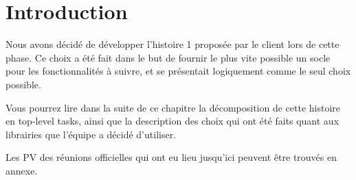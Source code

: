 \section{Introduction}
Nous avons décidé de développer l'histoire 1 proposée par le client
lors de cette phase. Ce choix a été fait dans le but de fournir le
plus vite possible un socle pour les fonctionnalités à suivre, et se
présentait logiquement comme le seul choix possible.

Vous pourrez lire dans la suite de ce chapitre la décomposition de cette
histoire en top-level tasks, ainsi que la description des choix qui ont été
faits quant aux librairies que l'équipe a décidé d'utiliser.

Les PV des réunions officielles qui ont eu lieu jusqu'ici peuvent être
trouvés en annexe.
